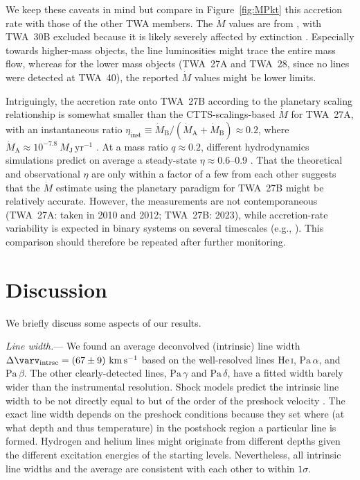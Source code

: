 \documentclass[twocolumn,twocolumnappendix]{aastex631}
\def\MJ{\ensuremath{M_{\textrm{J}}}\xspace}        %
\def\Paa{\ensuremath{\mathrm{Pa}\,\alpha}\xspace}           %
\def\Pab{\ensuremath{\mathrm{Pa}\,\beta}\xspace}            %
\def\Pag{\ensuremath{\mathrm{Pa}\,\gamma}\xspace}           %
\def\Pad{\ensuremath{\mathrm{Pa}\,\delta}\xspace}           %
\def\HeI{\ensuremath{\mathrm{He}}\,\textsc{i}\xspace}       %
\def\HeIt{\HeI}                     %
\def\MPkt{\ensuremath{\dot{M}}\xspace}                               %
\def\MPktA{\ensuremath{\dot{M}_{\textrm{A}}}\xspace}                  %
\def\MPktB{\ensuremath{\dot{M}_{\textrm{B}}}\xspace}                  %
\def\Dvint{\ensuremath{\Delta \varv_{\mathrm{intrsc}}}\xspace}
\def\kms{\ensuremath{\textrm{km}\,\textrm{s}^{-1}}\xspace}    %
\def\MPktEJ{\ensuremath{\MJ\,\textrm{yr}^{-1}}\xspace}        %
\def\twa{TWA~27A\xspace}
\def\twb{TWA~27B\xspace}
\begin{document}
We keep these caveats in mind but compare in Figure~\ref{fig:MPkt} this accretion rate with those of the other TWA members.
The \MPkt values are from \citet{venuti19}, with TWA~30B excluded because it is likely severely affected by extinction \citep{looper10b,rodriguez15}.
Especially towards higher-mass objects, the line luminosities might trace the entire mass flow,
whereas for the lower mass objects (\twa and TWA~28, since no lines were detected at TWA~40), the reported \MPkt values might be lower limits.

Intriguingly, the accretion rate onto \twb according to the planetary scaling relationship is somewhat smaller than the CTTS-scalings-based \MPkt for \twa, with an instantaneous ratio $\eta_{\mathrm{inst}}\equiv\MPktB/(\MPktA+\MPktB)
%
%
\approx0.2$,
where $\MPktA\approx10^{-7.8}~\MPktEJ$ \citep{venuti19}.
%
At a mass ratio $q\approx 0.2$,
%
different hydrodynamics simulations predict on average a steady-state $\eta\approx0.6$--0.9 \citep{bate00,lai23}.  %
That the theoretical and observational $\eta$ are only within a factor of a few from each other suggests that the \MPkt estimate using the planetary paradigm for \twb might be relatively accurate.
However, the measurements are not contemporaneous (\twa: taken in 2010 and 2012; \twb: 2023), while accretion-rate variability is expected in binary systems on several timescales (e.g., \citealp{mu20}). This comparison should therefore be repeated after further monitoring.


%
%
%
%


%

\section{Discussion}
 \label{sec:disc}

We briefly discuss some aspects of our results.

%
%
%
%
%
%
%
%
%



\textit{Line width.}---%
We found an average deconvolved (intrinsic) line width $\Dvint=(67\pm9)~\kms$ based on the well-resolved lines \HeIt, \Paa, and \Pab. The other clearly-detected lines, \Pag and \Pad, have a fitted width barely wider than the instrumental resolution.
Shock models predict the intrinsic line width to be not directly equal to but of the order of the preshock velocity \citep{aoyama18,Aoyama+Ikoma2019}.
%
The exact line width depends on the preshock conditions because they set where (at what depth and thus temperature) in the postshock region a particular line is formed.
%
%
Hydrogen and helium lines might originate from different depths given the different excitation energies of the starting levels.
%
%
%
%
Nevertheless, all intrinsic line widths and the average are consistent with each other to within $1\sigma$.
\end{document}
